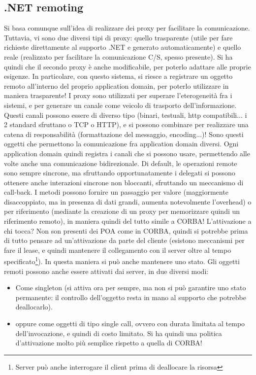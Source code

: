 \subsection{.NET remoting}
Si basa comunque sull'idea di realizzare dei proxy per facilitare la comunicazione.
Tuttavia, vi sono due diversi tipi di proxy: quello trasparente (utile per fare richieste direttamente al supporto .NET
e generato automaticamente) e quello reale (realizzato per facilitare la comunicazione C/S, spesso presente). Si ha
quindi che il secondo proxy è anche modificabile, per poterlo adattare alle proprie esigenze. In particolare, con
questo sistema, si riesce a registrare un oggetto remoto all'interno del proprio application domain, per poterlo
utilizzare in maniera trasparente!
I proxy sono utilizzati per superare l'eterogeneità fra i sistemi, e per generare un canale come veicolo di trasporto
dell'informazione. Questi canali possono essere di diverso tipo (binari, testuali, http compatibili... i 2 standard
sfruttano o TCP o HTTP), e si possono combinare per realizzare una catena di responsabilità (formattazione del
messaggio, encoding...)! Sono questi oggetti che permettono la comunicazione fra application domain diversi. Ogni
application domain quindi registra i canali che si possono usare, permettendo alle volte anche una comunicazione
bidirezionale.
Di default, le operazioni remote sono sempre sincrone, ma sfruttando opportunatamente i delegati si possono ottenere
anche interazioni sincrone non bloccanti, sfruttando un meccanismo di call-back. I metodi possono fornire un
passaggio per valore (maggiormente disaccoppiato, ma in presenza di dati grandi, aumenta notevolmente l'overhead) o per
riferimento (mediante la creazione di un proxy per memorizzare quindi un riferimento remoto), in maniera quindi del
tutto simile a CORBA!
L'attivazione a chi tocca? Non son presenti dei POA come in CORBA, quindi si potrebbe prima di tutto pensare ad
un'attivazione da parte del cliente (esistono meccanismi per fare il lease, e quindi mantenere il collegamento con il
server oltre al tempo specificato\footnote{Server può anche interrogare il client prima di deallocare la risorsa}). In
questa maniera si può anche mantenere uno stato.
Gli oggetti remoti possono anche essere attivati dai server, in due diversi modi:
\begin{itemize}
 \item Come singleton (si attiva ora per sempre, ma non si può garantire uno stato permanente: il controllo dell'oggetto
 resta in mano al supporto che potrebbe deallocarlo).
 \item oppure come oggetti di tipo single call, ovvero con durata limitata al tempo dell'invocazione, e quindi di costo
 limitato. Si ha quindi una politica d'attivazione molto più semplice rispetto a quella di CORBA!
\end{itemize}